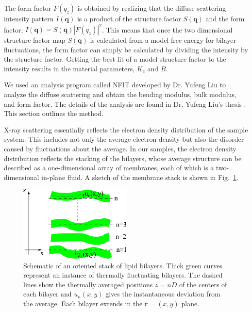 The form factor $F(q_z)$ is obtained by realizing that the diffuse scattering
intensity pattern $I(\mathbf{q})$ is a product of the structure factor $S(\mathbf{q})$ and
the form factor; $I(\mathbf{q})= S(\mathbf{q})|F(q_z)|^2$. This means that 
once the two dimensional structure factor map $S(\mathbf{q})$ is calculated 
from a model free energy for bilayer fluctuations, the form factor can simply
be calculated by dividing the intensity by the structure factor. 
Getting the best fit of a model structure factor to the intensity results in 
the material parameters, $K_c$ and $B$.

We used an analysis program called NFIT developed by Dr. Yufeng Liu
\cite{Lyatskaya01,Liu04,Liu03} to analyze the diffuse scattering and
obtain the bending modulus, bulk modulus, and form factor. 
The details of the analysis are found in Dr. Yufeng Liu's thesis 
\cite{Liu03}. This section outlines the method. 

X-ray scattering essentially reflects the electron density distribution
of the sample system. This includes not only the average electron
density but also the disorder caused by fluctuations about the average.
In our samples, the electron density distribution reflects
the stacking of the bilayers, whose average structure can be described
as a one-dimensional array of membranes, each of which is a two-dimensional
in-plane fluid. A sketch of the membrane stack is shown in Fig.~\ref{fig:stack}.

\begin{figure}[htbp]
  \centering
  \includegraphics[width=0.5\textwidth]{figures/Tat/stack}
  \caption{Schematic of an oriented stack of lipid bilayers. Thick green curves
  represent an instance of thermally fluctuating bilayers. The dashed lines 
  show the thermally averaged positions $z=nD$ of the centers of each bilayer 
  and $u_{n}(x,y)$ gives the instantaneous deviation from the average. 
  Each bilayer extends in the $\mathbf{r}=\left(x,y\right)$ plane.}
  \label{fig:stack}
\end{figure}

